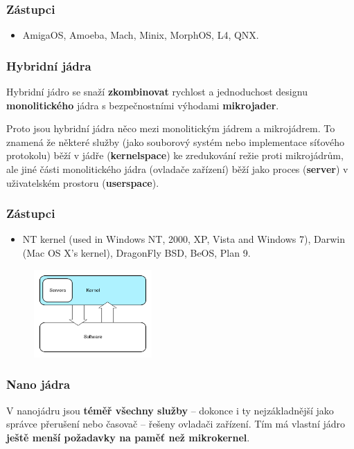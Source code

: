 \subsubsection*{Zástupci}
\begin{itemize}
\item AmigaOS, Amoeba, Mach, Minix, MorphOS, L4, QNX.
\end{itemize}

\subsubsection{Hybridní jádra}
Hybridní jádro se snaží \textbf{zkombinovat} rychlost a jednoduchost designu \textbf{monolitického} jádra s bezpečnostními výhodami \textbf{mikrojader}. 

Proto jsou hybridní jádra něco mezi monolitickým jádrem a mikrojádrem. To znamená že některé služby (jako souborový systém nebo implementace síťového protokolu) běží v jádře (\textbf{kernelspace}) ke zredukování režie proti mikrojádrům, ale jiné části monolitického jádra (ovladače zařízení) běží jako proces (\textbf{server}) v uživatelském prostoru (\textbf{userspace}).

\subsubsection*{Zástupci}
\begin{itemize}
\item NT kernel (used in Windows NT, 2000, XP, Vista and Windows 7), Darwin (Mac OS X's kernel), DragonFly BSD, BeOS, Plan 9.
\end{itemize}
\begin{figure}[H]
	\centering
	\includegraphics[width=0.4\textwidth]{assets/3_hybridkernel}
\end{figure}

\subsubsection{Nano jádra}
V nanojádru jsou \textbf{téměř všechny služby} – dokonce i ty nejzákladnější jako správce přerušení nebo časovač – řešeny ovladači zařízení. Tím má vlastní jádro\textbf{ ještě menší požadavky na paměť než mikrokernel}.

